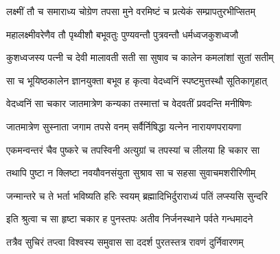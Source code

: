
\translink{}

\storymeta




\twolineshloka
{लक्ष्मीं तौ च समाराध्य चोग्रेण तपसा मुने}
{वरमिष्टं च प्रत्येकं सम्प्रापतुरभीप्सितम्} %

\twolineshloka
{महालक्ष्मीवरेणैव तौ पृथ्वीशौ बभूवतुः}
{पुण्यवन्तौ पुत्रवन्तौ धर्मध्वजकुशध्वजौ} %

\twolineshloka
{कुशध्वजस्य पत्‍नी च देवी मालावती सती}
{सा सुषाव च कालेन कमलांशां सुतां सतीम्} %

\twolineshloka
{सा च भूयिष्ठकालेन ज्ञानयुक्ता बभूव ह}
{कृत्वा वेदध्वनिं स्पष्टमुत्तस्थौ सूतिकागृहात्} %

\twolineshloka
{वेदध्वनिं सा चकार जातमात्रेण कन्यका}
{तस्मात्तां च वेदवतीं प्रवदन्ति मनीषिणः} %

\twolineshloka
{जातमात्रेण सुस्नाता जगाम तपसे वनम्}
{सर्वैर्निषिद्धा यत्‍नेन नारायणपरायणा} %

\twolineshloka
{एकमन्वन्तरं चैव पुष्करे च तपस्विनी}
{अत्युग्रां च तपस्यां च लीलया हि चकार सा} %

\twolineshloka
{तथापि पुष्टा न क्लिष्टा नवयौवनसंयुता}
{सुश्राव सा च सहसा सुवाचमशरीरिणीम्} %

\twolineshloka
{जन्मान्तरे च ते भर्ता भविष्यति हरिः स्वयम्}
{ब्रह्मादिभिर्दुराराध्यं पतिं लप्स्यसि सुन्दरि} %

\twolineshloka
{इति श्रुत्वा च सा हृष्टा चकार ह पुनस्तपः}
{अतीव निर्जनस्थाने पर्वते गन्धमादने} %

\twolineshloka
{तत्रैव सुचिरं तप्त्वा विश्वस्य समुवास सा}
{ददर्श पुरतस्तत्र रावणं दुर्निवारणम्} %

